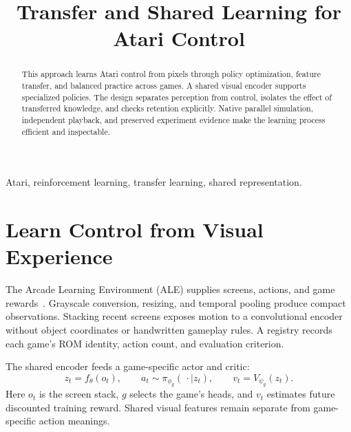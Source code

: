 

\title{Transfer and Shared Learning for Atari Control}
\author{
}
\date{}


\maketitle

\begin{abstract}
This approach learns Atari control from pixels through policy
optimization, feature transfer, and balanced practice across games.
A shared visual encoder supports specialized policies. The design
separates perception from control, isolates the effect of transferred
knowledge, and checks retention explicitly. Native parallel simulation,
independent playback, and preserved experiment evidence make the
learning process efficient and inspectable.
\end{abstract}

\begin{IEEEkeywords}
Atari, reinforcement learning, transfer learning, shared representation.
\end{IEEEkeywords}

\balance
\section{Learn Control from Visual Experience}
The Arcade Learning Environment (ALE) supplies screens, actions, and
game rewards~\cite{machado2018}. Grayscale conversion, resizing, and
temporal pooling produce compact observations. Stacking recent screens
exposes motion to a convolutional encoder without object coordinates
or handwritten gameplay rules. A registry records each game's ROM
identity, action count, and evaluation criterion.

The shared encoder feeds a game-specific actor and critic:
\begin{equation}
z_t=f_\theta(o_t),\qquad
a_t\sim\pi_{\phi_g}(\,\cdot\mid z_t),\qquad
v_t=V_{\psi_g}(z_t).
\end{equation}
Here $o_t$ is the screen stack, $g$ selects the game's heads, and $v_t$
estimates future discounted training reward. Shared visual features
remain separate from game-specific action meanings.

